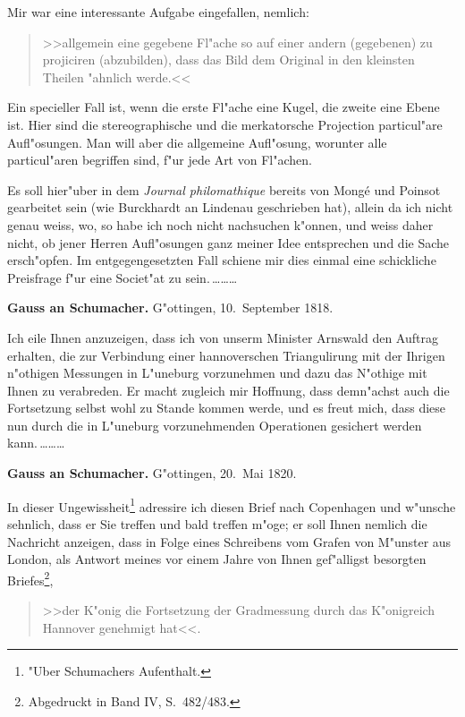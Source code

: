\documentclass[12pt,a4paper]{article}
\theoremstyle{plain}
\theoremstyle{definition}
\theoremstyle{remark}
\begin{document}
\medskip
\noindent Mir war eine interessante Aufgabe eingefallen, nemlich:
\begin{quote}
>>allgemein eine gegebene Fl"ache so auf einer andern (gegebenen) zu projiciren (abzubilden), dass das Bild dem Original in den kleinsten Theilen "ahnlich werde.<<
\end{quote}
Ein specieller Fall ist, wenn die erste Fl"ache eine Kugel, die zweite eine Ebene ist. Hier sind die stereographische und die merkatorsche Projection particul"are Aufl"osungen. Man will aber die allgemeine Aufl"osung, worunter alle particul"aren begriffen sind, f"ur jede Art von Fl"achen.

Es soll hier"uber in dem \emph{Journal philomathique} bereits von Mong\'e und Poinsot gearbeitet sein (wie Burckhardt an Lindenau geschrieben hat), allein da ich nicht genau weiss, wo, so habe ich noch nicht nachsuchen k"onnen, und weiss daher nicht, ob jener Herren Aufl"osungen ganz meiner Idee entsprechen und die Sache ersch"opfen. Im entgegengesetzten Fall schiene mir dies einmal eine schickliche Preisfrage f"ur eine Societ"at zu sein.\,\ldots\ldots\ldots

\newpage
\noindent \textbf{Gauss an Schumacher.} G"ottingen, 10.~September 1818.

\medskip
\noindent Ich eile Ihnen anzuzeigen, dass ich von unserm Minister Arnswald den Auftrag erhalten, die zur Verbindung einer hannoverschen Triangulirung mit der Ihrigen n"othigen Messungen in L"uneburg vorzunehmen und dazu das N"othige mit Ihnen zu verabreden. Er macht zugleich mir Hoffnung, dass demn"achst auch die Fortsetzung selbst wohl zu Stande kommen werde, und es freut mich, dass diese nun durch die in L"uneburg vorzunehmenden Operationen gesichert werden kann.\,\ldots\ldots\ldots

\medskip
\noindent \textbf{Gauss an Schumacher.} G"ottingen, 20.~Mai 1820.

\medskip
\noindent In dieser Ungewissheit\footnote{"Uber Schumachers Aufenthalt.} adressire ich diesen Brief nach Copenhagen und w"unsche sehnlich, dass er Sie treffen und bald treffen m"oge; er soll Ihnen nemlich die Nachricht anzeigen, dass in Folge eines Schreibens vom Grafen von M"unster aus London, als Antwort meines vor einem Jahre von Ihnen gef"alligst besorgten Briefes\footnote{Abgedruckt in Band IV, S.~482/483.},
\begin{quote}
>>der K"onig die Fortsetzung der Gradmessung durch das K"onigreich Hannover genehmigt hat<<.
\end{quote}
\end{document}
